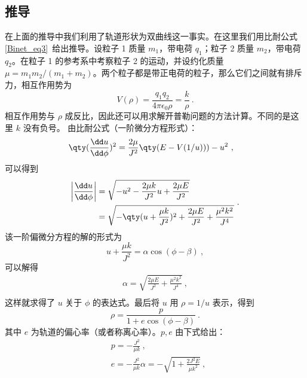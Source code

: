 \subsection{推导}
在上面的推导中我们利用了轨道形状为双曲线这一事实。在这里我们用比耐公式\autoref{Binet_eq3}~给出推导。设粒子 1 质量 $m_1$，带电荷 $q_1$；粒子 2 质量 $m_2$，带电荷 $q_2$。在粒子 1 的参考系中考察粒子 2 的运动，并设约化质量 $\mu=m_1m_2/(m_1+m_2)$。两个粒子都是带正电荷的粒子，那么它们之间就有排斥力，相互作用势为
\begin{equation}
V(\rho)=\frac{q_1q_2}{4\pi\epsilon_0\rho}=\frac{k}{\rho}~.
\end{equation}
相互作用势与 $\rho$ 成反比，因此还可以用求解开普勒问题的方法计算。不同的是这里 $k$ 没有负号。
由比耐公式（一阶微分方程形式）：
\begin{equation}
\begin{aligned}
&\qty(\frac{\dd u}{\dd \phi})^2=\frac{2\mu}{J^2}\qty(E-V(1/u)))-u^2~,
\end{aligned}
\end{equation}
可以得到
\begin{equation}
\begin{aligned}
\left|\frac{\dd u}{\dd \phi}\right|&=\sqrt{-u^2-\frac{2\mu k}{J^2}u+\frac{2\mu E}{J^2}}\\
&=\sqrt{-\qty(u+\frac{\mu k}{J^2})^2+\frac{2\mu E}{J^2}+\frac{\mu^2 k^2}{J^4}}
\end{aligned}~.
\end{equation}
该一阶偏微分方程的解的形式为
\begin{equation}
u+\frac{\mu k}{J^2}=\alpha\cos(\phi-\beta)~,
\end{equation}
可以解得
\begin{equation}
\begin{aligned}
\alpha=\sqrt{\frac{2\mu E}{J^2}+\frac{\mu^2 k^2}{J^4}}~,\\
\end{aligned}
\end{equation}
这样就求得了 $u$ 关于 $\phi$ 的表达式。最后将 $u$ 用 $\rho=1/u$ 表示，得到
\begin{equation}
\rho=\frac{p}{1+e\cos(\phi-\beta)}~.
\end{equation}
其中 $e$ 为轨道的偏心率（或者称离心率）。$p,e$ 由下式给出：
\begin{equation}
\begin{aligned}
&p=-\frac{J^2}{\mu k}~,\\
&e=-\frac{J^2}{\mu k}\alpha=-\sqrt{1+\frac{2J^2E}{\mu k^2}}~,
\end{aligned}
\end{equation}
